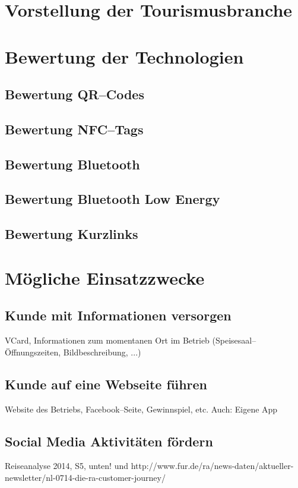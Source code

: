 \section{Vorstellung der Tourismusbranche}
\label{sec:hauptteil}

\section{Bewertung der Technologien}
\label{sec:bewertung}

\subsection{Bewertung QR–Codes}
\subsection{Bewertung NFC--Tags}
\subsection{Bewertung Bluetooth}
\subsection{Bewertung Bluetooth Low Energy}
\subsection{Bewertung Kurzlinks}

\section{Mögliche Einsatzzwecke}
\label{sec:einsatzzwecke}

\subsection{Kunde mit Informationen versorgen}

VCard, Informationen zum momentanen Ort im Betrieb (Speisesaal--Öffnungszeiten, Bildbeschreibung, ...)

\subsection{Kunde auf eine Webseite führen}
Website des Betriebs, Facebook--Seite, Gewinnspiel, etc.
Auch: Eigene App

\subsection{Social Media Aktivitäten fördern}
Reiseanalyse 2014, S5, unten! und http://www.fur.de/ra/news-daten/aktueller-newsletter/nl-0714-die-ra-customer-journey/ 

